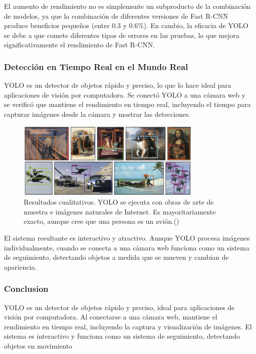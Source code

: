 El aumento de rendimiento no es simplemente un subproducto de la combinación de modelos, ya que la combinación de diferentes versiones de Fast R-CNN produce beneficios pequeños (entre 0.3 y 0.6\%). En cambio, la eficacia de YOLO se debe a que comete diferentes tipos de errores en las pruebas, lo que mejora significativamente el rendimiento de Fast R-CNN.


\subsubsection{Detección en Tiempo Real en el Mundo Real}

YOLO es un detector de objetos rápido y preciso, lo que lo hace ideal para aplicaciones de visión por computadora. Se conectó YOLO a una cámara web y se verificó que mantiene el rendimiento en tiempo real, incluyendo el tiempo para capturar imágenes desde la cámara y mostrar las detecciones.

\begin{figure}[h]
	\centering
	\includegraphics[width=0.8\textwidth]{2/figures/yolo5.jpeg}
	\caption{Resultados cualitativos. YOLO se ejecuta con obras de arte de muestra e imágenes naturales de Internet. Es mayoritariamente exacto, aunque cree que una persona es un avión.(\cite{tecnica4})}
	
\end{figure}

El sistema resultante es interactivo y atractivo. Aunque YOLO procesa imágenes individualmente, cuando se conecta a una cámara web funciona como un sistema de seguimiento, detectando objetos a medida que se mueven y cambian de apariencia.

\subsubsection{Conclusion}
YOLO es un detector de objetos rápido y preciso, ideal para aplicaciones de visión por computadora. Al conectarse a una cámara web, mantiene el rendimiento en tiempo real, incluyendo la captura y visualización de imágenes. El sistema es interactivo y funciona como un sistema de seguimiento, detectando objetos en movimiento